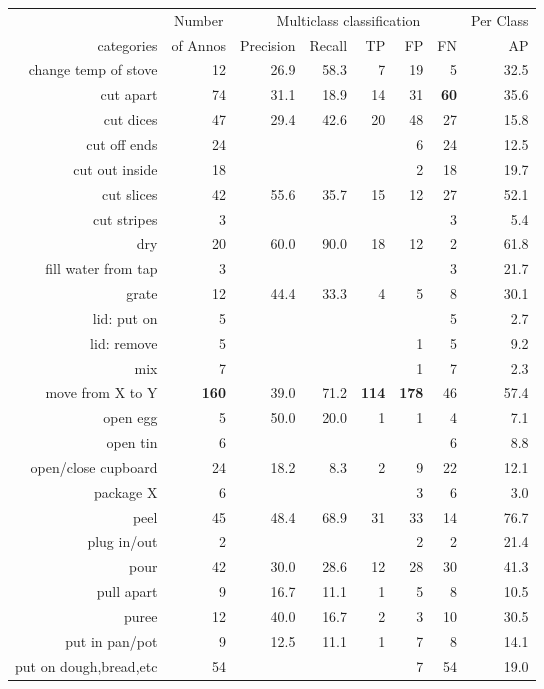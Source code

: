 \begin{tabular}{r r r@{\ \ }r@{\ \ }r@{\ \ }r@{\ \ }r r}
\toprule  & \multicolumn{1}{c}{Number}  & \multicolumn{5}{c}{Multiclass classification}  & \multicolumn{1}{c}{Per Class} \\
categories&of Annos&Precision&Recall&TP&FP&FN&AP\\
\cmidrule(lr){1-1} \cmidrule(lr){2-2} \cmidrule(lr){3-7} \cmidrule(lr){8-8}
change temp of stove & 12 & 26.9 & 58.3 & 7 & 19 & 5 & 32.5 \\
cut apart & 74 & 31.1 & 18.9 & 14 & 31 & \textbf{60} & 35.6 \\
cut dices & 47 & 29.4 & 42.6 & 20 & 48 & 27 & 15.8 \\
cut off ends & 24 &  &  &  & 6 & 24 & 12.5 \\
cut out inside & 18 &  &  &  & 2 & 18 & 19.7 \\
cut slices & 42 & 55.6 & 35.7 & 15 & 12 & 27 & 52.1 \\
cut stripes & 3 &  &  &  &  & 3 & 5.4 \\
dry & 20 & 60.0 & 90.0 & 18 & 12 & 2 & 61.8 \\
fill water from tap & 3 &  &  &  &  & 3 & 21.7 \\
grate & 12 & 44.4 & 33.3 & 4 & 5 & 8 & 30.1 \\
lid: put on & 5 &  &  &  &  & 5 & 2.7 \\
lid: remove & 5 &  &  &  & 1 & 5 & 9.2 \\
mix & 7 &  &  &  & 1 & 7 & 2.3 \\
move from X to Y & \textbf{160} & 39.0 & 71.2 & \textbf{114} & \textbf{178} & 46 & 57.4 \\
open egg & 5 & 50.0 & 20.0 & 1 & 1 & 4 & 7.1 \\
open tin & 6 &  &  &  &  & 6 & 8.8 \\
open/close cupboard & 24 & 18.2 & 8.3 & 2 & 9 & 22 & 12.1 \\
package X & 6 &  &  &  & 3 & 6 & 3.0 \\
peel & 45 & 48.4 & 68.9 & 31 & 33 & 14 & 76.7 \\
plug in/out & 2 &  &  &  & 2 & 2 & 21.4 \\
pour & 42 & 30.0 & 28.6 & 12 & 28 & 30 & 41.3 \\
pull apart & 9 & 16.7 & 11.1 & 1 & 5 & 8 & 10.5 \\
puree & 12 & 40.0 & 16.7 & 2 & 3 & 10 & 30.5 \\
put in pan/pot & 9 & 12.5 & 11.1 & 1 & 7 & 8 & 14.1 \\
put on dough,bread,etc & 54 &  &  &  & 7 & 54 & 19.0 \\

\end{tabular}
